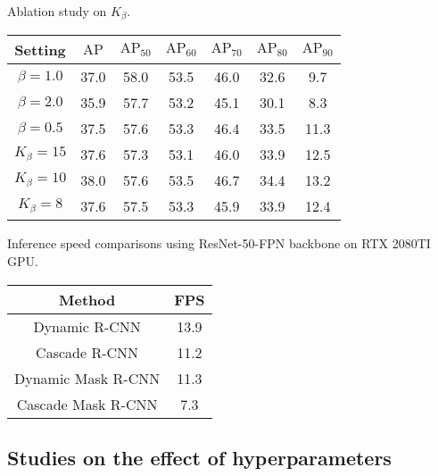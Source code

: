 \documentclass[runningheads]{llncs}
\begin{document}
\noindent
\begin{minipage}[!t]{\textwidth}
    \begin{minipage}{0.56\textwidth}
    \centering
        \makeatletter{}\makeatother\caption{Ablation study on $K_\beta$.}
        \setlength{\tabcolsep}{1pt}
        \begin{tabular}{ccccccc}
        \toprule
        Setting & $\mathrm{AP}$ & $\mathrm{AP}_{50}$ & $\mathrm{AP}_{60}$ & $\mathrm{AP}_{70}$ & $\mathrm{AP}_{80}$ & $\mathrm{AP}_{90}$\\
        \midrule
        $\beta=1.0$ & 37.0 & 58.0 & 53.5 & 46.0 & 32.6 & 9.7\\
        $\beta=2.0$ & 35.9 & 57.7 & 53.2 & 45.1 & 30.1 & 8.3\\
        $\beta=0.5$ & 37.5 & 57.6 & 53.3 & 46.4 & 33.5 & 11.3\\
        \midrule
        $K_\beta=15$ & 37.6 & 57.3 & 53.1 & 46.0 & 33.9 & 12.5\\
        $K_\beta=10$ & 38.0 & 57.6 & 53.5 & 46.7 & 34.4 & 13.2\\
        $K_\beta=8$ & 37.6 & 57.5 & 53.3 & 45.9 & 33.9 & 12.4\\
        \bottomrule
        \end{tabular}
        \label{tab:dynamic_smoothL1}
    \end{minipage}
    \begin{minipage}{0.42\textwidth}
    \centering
        \makeatletter{}\makeatother\caption{Inference speed comparisons using ResNet-50-FPN backbone on RTX 2080TI GPU.}
        \setlength{\tabcolsep}{1pt}
        \begin{tabular}{cc}
        \toprule
        Method & FPS\\
        \midrule
        Dynamic R-CNN & 13.9\\
        Cascade R-CNN & 11.2\\
        Dynamic Mask R-CNN & 11.3\\
        Cascade Mask R-CNN & 7.3\\
        \bottomrule
        \end{tabular}
        \label{tab:speed}
    \end{minipage}
\end{minipage}


\subsection{Studies on the effect of hyperparameters}
\end{document}

